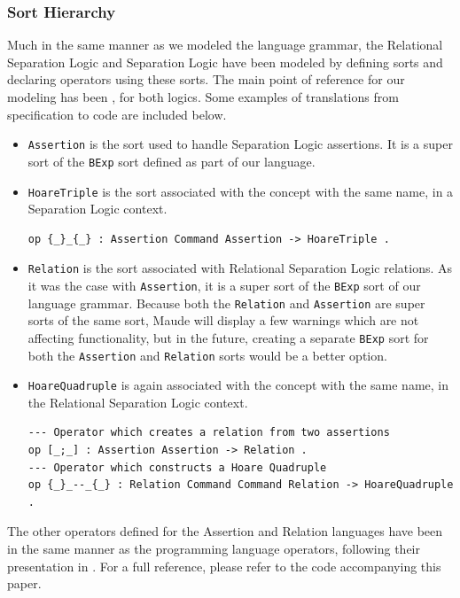 \documentclass[12pt,a4paper]{article}
\begin{document}
\subsubsection{Sort Hierarchy}
Much in the same manner as we modeled the language grammar, the Relational Separation Logic \cite{relational} and Separation Logic \cite{SeparationLogic} \cite{primer} have been modeled by defining sorts and declaring operators using these sorts. The main point of reference for our modeling has been \cite{relational}, for both logics. Some examples of translations from specification to code are included below.
\begin{itemize}
	\item \texttt{Assertion} is the sort used to handle Separation Logic assertions. It is a super sort of the \texttt{BExp} sort defined as part of our language.
	\item \texttt{HoareTriple} is the sort associated with the concept with the same name, in a Separation Logic context.
	\begin{lstlisting}[caption=Hoare Triple constructor operator]
op {_}_{_} : Assertion Command Assertion -> HoareTriple .\end{lstlisting}
	\item \texttt{Relation} is the sort associated with Relational Separation Logic relations. As it was the case with \texttt{Assertion}, it is a super sort of the \texttt{BExp} sort of our language grammar. Because both the \texttt{Relation} and \texttt{Assertion} are super sorts of the same sort, Maude will display a few warnings which are not affecting functionality, but in the future, creating a separate \texttt{BExp} sort for both the \texttt{Assertion} and \texttt{Relation} sorts would be a better option.
	\item \texttt{HoareQuadruple} is again associated with the concept with the same name, in the Relational Separation Logic context.
	\begin{lstlisting}[caption=Examples of Relational Separation Logic specific constructs]
--- Operator which creates a relation from two assertions
op [_;_] : Assertion Assertion -> Relation .
--- Operator which constructs a Hoare Quadruple 
op {_}_--_{_} : Relation Command Command Relation -> HoareQuadruple .\end{lstlisting}
\end{itemize}
The other operators defined for the Assertion and Relation languages have been in the same manner as the programming language operators, following their presentation in \cite{relational}. For a full reference, please refer to the code accompanying this paper.
\end{document}
